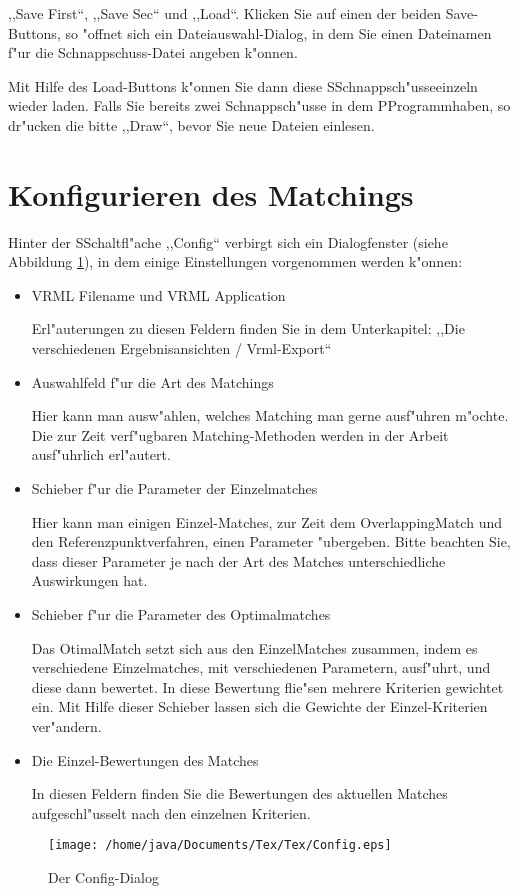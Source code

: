 ,,Save First``, ,,Save Sec`` und ,,Load``. Klicken Sie auf einen der beiden Save-Buttons, so "offnet sich ein Dateiauswahl-Dialog, in dem Sie einen Dateinamen f"ur die Schnappschuss-Datei angeben k"onnen.

Mit Hilfe des Load-Buttons k"onnen Sie dann diese SSchnappsch"usseeinzeln wieder laden. Falls Sie bereits zwei Schnappsch"usse in dem PProgrammhaben, so dr"ucken die bitte ,,Draw``, bevor Sie neue Dateien einlesen.
\section{Konfigurieren des Matchings}
Hinter der SSchaltfl"ache ,,Config`` verbirgt sich ein Dialogfenster (siehe Abbildung \ref{fig:Config}), in dem einige Einstellungen vorgenommen werden k"onnen:
\begin{itemize}
\item VRML Filename und VRML Application

Erl"auterungen zu diesen Feldern finden Sie in dem Unterkapitel: ,,Die verschiedenen Ergebnisansichten / Vrml-Export``
\item Auswahlfeld f"ur die Art des Matchings

Hier kann man ausw"ahlen, welches Matching man gerne ausf"uhren m"ochte. Die zur Zeit verf"ugbaren Matching-Methoden werden in der Arbeit ausf"uhrlich erl"autert.
\item Schieber f"ur die Parameter der Einzelmatches

Hier kann man einigen Einzel-Matches, zur Zeit dem OverlappingMatch und den Referenzpunktverfahren, einen Parameter "ubergeben. Bitte beachten Sie, dass dieser Parameter je nach der Art des Matches unterschiedliche Auswirkungen hat.
\item Schieber f"ur die Parameter des Optimalmatches

Das OtimalMatch setzt sich aus den EinzelMatches zusammen, indem es verschiedene Einzelmatches, mit verschiedenen Parametern, ausf"uhrt, und diese dann bewertet. In diese Bewertung flie"sen mehrere Kriterien gewichtet ein. Mit Hilfe dieser Schieber lassen sich die Gewichte der Einzel-Kriterien ver"andern.
\item Die Einzel-Bewertungen des Matches

In diesen Feldern finden Sie die Bewertungen des aktuellen Matches aufgeschl"usselt nach den einzelnen Kriterien.
\end{itemize} 
\begin{figure}
   \centering
   \texttt{[image: /home/java/Documents/Tex/Tex/Config.eps]}
   \caption{Der Config-Dialog}
   \label{fig:Config}
\end{figure}
